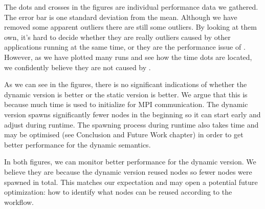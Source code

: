 The dots and crosses in the figures are individual performance data we gathered. The error bar is one standard deviation from the mean. Although we have removed some apparent outliers there are still some outliers. By looking at them own, it's hard to decide whether they are really outliers caused by other applications running at the same time, or they are the performance issue of \dpy. However, as we have plotted many runs and see how the time dots are located, we confidently believe they are not caused by \dpy.

As we can see in the figures, there is no significant indications of whether the dynamic version is better or the static version is better. We argue that this is because much time is used to initialize for MPI communication. The dynamic version spawns significantly fewer nodes in the beginning so it can start early and adjust during runtime. The spawning process during runtime also takes time and may be optimised (see Conclusion and Future Work chapter) in order to get better performance for the dynamic semantics.

In both figures, we can monitor better performance for the dynamic version. We believe they are because the dynamic version reused nodes so fewer nodes were spawned in total. This matches our expectation and may open a potential future optimization: how to identify what nodes can be reused according to the workflow.
